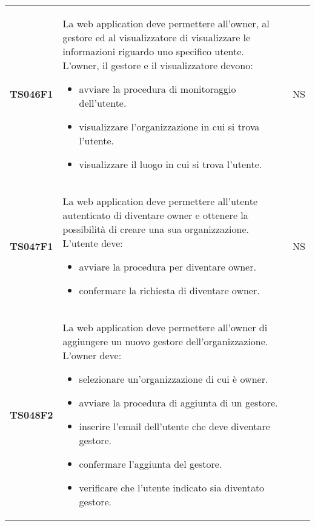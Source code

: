 \documentclass[../piano-di-qualifica.tex]{subfiles}
\begin{document}
\begin{longtable}[H]{>{\centering\bfseries}m{3cm} >{}m{10cm} >{\centering\arraybackslash}m{3cm}}
  TS046F1            & La web application deve permettere all'owner, al gestore ed al visualizzatore di visualizzare le informazioni riguardo uno specifico utente. \newline
  L'owner, il gestore e il visualizzatore devono:
  \begin{itemize}
    \item avviare la procedura di monitoraggio dell'utente.
    \item visualizzare l'organizzazione in cui si trova l'utente.
    \item visualizzare il luogo in cui si trova l'utente.
  \end{itemize}
                     & NS                                                                                                                                                                                                                                                               \\
  TS047F1            & La web application deve permettere all'utente autenticato di diventare owner e ottenere la possibilità di creare una sua organizzazione. \newline
  L'utente deve:
  \begin{itemize}
    \item avviare la procedura per diventare owner.
    \item confermare la richiesta di diventare owner.
  \end{itemize}
                     & NS                                                                                                                                                                                                                                                               \\
  TS048F2            & La web application deve permettere all'owner di aggiungere un nuovo gestore dell'organizzazione. \newline
  L'owner deve:
  \begin{itemize}
    \item selezionare un'organizzazione di cui è owner.
    \item avviare la procedura di aggiunta di un gestore.
    \item inserire l'email dell'utente che deve diventare gestore.
    \item confermare l'aggiunta del gestore.
    \item verificare che l'utente indicato sia diventato gestore.
  \end{itemize}

\end{longtable}
\end{document}
